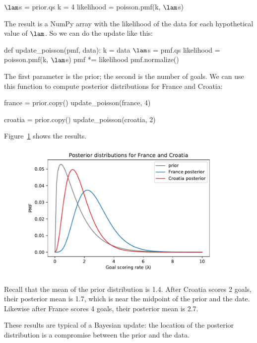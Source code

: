 \documentclass[12pt]{book}
\theoremstyle{exercise}
\begin{document}
\begin{code}
$\lam$s = prior.qs
k = 4
likelihood = poisson.pmf(k, $\lam$s)
\end{code}

The result is a NumPy array with the likelihood of the data for each hypothetical value of $\lam$.
So we can do the update like this:

\begin{code}
def update_poisson(pmf, data):
    k = data
    $\lam$s = pmf.qs
    likelihood = poisson.pmf(k, $\lam$s)
    pmf *= likelihood
    pmf.normalize()
\end{code}  

The first parameter is the prior; the second is the number of goals.
We can use this function to compute posterior distributions for France and Croatia:

\begin{code}
france = prior.copy()
update_poisson(france, 4)

croatia = prior.copy()
update_poisson(croatia, 2)
\end{code}

Figure~\ref{fig07-03} shows the results.

\begin{figure}
\centerline{\includegraphics[width=4in]{figs/fig07-03.pdf}}
\caption{}
\label{fig07-03}
\end{figure}

Recall that the mean of the prior distribution is 1.4.
After Croatia scores 2 goals, their posterior mean is 1.7, which is near the midpoint of the prior and the date.
Likewise after France scores 4 goals, their posterior mean is 2.7.

These results are typical of a Bayesian update: the location of the posterior distribution is a compromise between the prior and the data.
\end{document}
